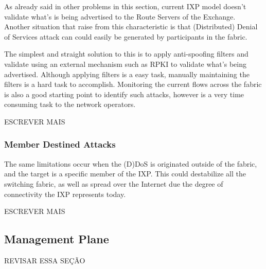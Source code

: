 \documentclass[12pt]{article}
\begin{document}
As already said in other problems in this section, current IXP model doesn't validate what's is being advertised to the Route Servers of the Exchange. Another situation that raise from this characteristic is that (Distributed) Denial of Services attack can could easily be generated by participants in the fabric. 


The simplest and straight solution to this is to apply anti-spoofing filters and validate using an external mechanism such as RPKI to validate what's being advertised. Although applying filters is a easy task, manually maintaining the filters is a hard task to accomplish. Monitoring the current flows across the fabric is also a good starting point to identify such attacks, however is a very time consuming task to the network operators.

ESCREVER MAIS

\subsubsection{Member Destined Attacks}

The same limitations occur when the (D)DoS is originated outside of the fabric, and the target is a specific member of the IXP. This could destabilize all the switching fabric, as well as spread over the Internet due the degree of connectivity the IXP represents today.

ESCREVER MAIS

\subsection{Management Plane}
REVISAR ESSA SEÇÃO
\end{document}
